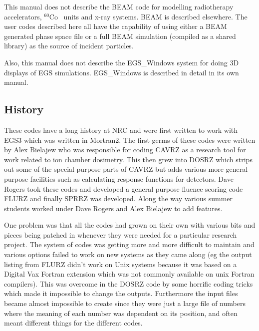 \documentclass[12pt,twoside]{article}  %
\newcommand{\Co}{$^{60}$Co}
\begin{document}
This manual does not describe the BEAM code for modelling radiotherapy
accelerators, \Co~ units and x-ray systems. BEAM is described
elsewhere\cite{Ro95,Ro98a}. The user codes
described here all have the capability of using either a BEAM generated phase
space file or a full BEAM simulation (compiled as a shared library)
as the source of incident particles.

Also, this manual does not describe the EGS\_Windows system for doing 3D
displays of EGS simulations. EGS\_Windows is described in detail in its own
manual\cite{TR99a}.

\subsection{History}
These codes have a long history at NRC and were first written to work
with EGS3 which was written in Mortran2.  The first germs of these
codes were written by Alex Bielajew who was responsible for coding
CAVRZ as a research tool for work related to ion chamber dosimetry.
This then grew into DOSRZ which strips out some of the special purpose
parts of CAVRZ but adds various more general purpose facilities such as
calculating response functions for detectors. Dave Rogers took these
codes and developed a general purpose fluence scoring code FLURZ and
finally SPRRZ was developed.  Along the way various summer students worked
under Dave Rogers and Alex Bielajew to add features.

One problem was that
all the codes had grown on their own with various bits and pieces being
patched in whenever they were needed for a particular research project.
The system of codes was getting more and more difficult to maintain
and various options failed to work on new systems as they came along
(eg the output listing from FLURZ didn't work on Unix systems
because it was based on a
Digital Vax Fortran extension which was not commonly available on unix
Fortran compilers).  This was overcome in the DOSRZ code by some horrific
coding tricks which made it impossible to change the outputs.  Furthermore the
input files became almost impossible to create since they were just a
large file of numbers where the meaning of each number was dependent on
its position, and often meant different things for the different codes.
\end{document}
